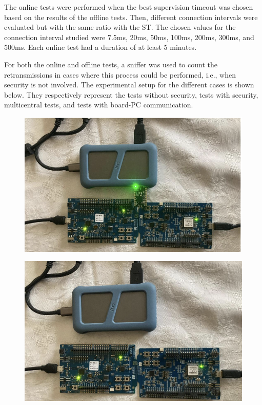 \documentclass{Configuration_Files/PoliMi3i_thesis}
\begin{document}
The online tests were performed when the best supervision timeout was chosen based on the results of the offline tests. Then, different connection intervals were evaluated but with the same ratio with the ST. The chosen values for the connection interval studied were 7.5ms, 20ms, 50ms, 100ms, 200ms, 300ms, and 500ms. Each online test had a duration of at least 5 minutes.

For both the online and offline tests, a sniffer was used to count the retransmissions in cases where this process could be performed, i.e., when security is not involved. The experimental setup for the different cases is shown below. They respectively represent the tests without security, tests with security, multicentral tests, and tests with board-PC communication.

\begin{figure}[H]
    \centering
    \includegraphics[scale=0.3]{Test_Procedure/4.png}
    \label{fig:ideal_tests_without_security}
\end{figure}

\begin{figure}[H]
    \centering
    \includegraphics[scale=0.3]{Test_Procedure/5.png}
    \label{fig:ideal_tests_with_security}
\end{figure}
\end{document}
